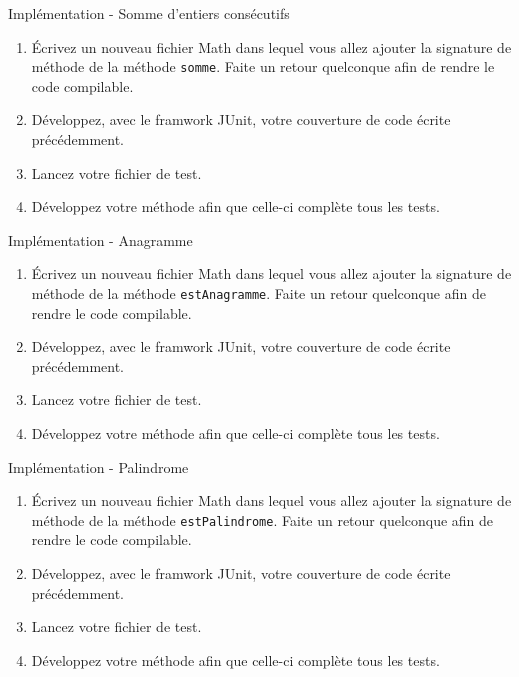 \documentclass[a4paper,11pt]{article}
\begin{document}
	\begin{Exercice}{Implémentation - Somme d'entiers consécutifs}
		\begin{enumerate}
			\item Écrivez un nouveau fichier Math dans lequel vous allez ajouter la signature de méthode de la méthode \texttt{somme}. Faite un retour quelconque afin de rendre le code compilable.
			\item Développez, avec le framwork JUnit, votre couverture de code écrite précédemment.
			\item Lancez votre fichier de test.
			\item Développez votre méthode afin que celle-ci complète tous les tests.
		\end{enumerate}
	\end{Exercice}
	
	\begin{Exercice}{Implémentation - Anagramme}
		\begin{enumerate}
			\item Écrivez un nouveau fichier Math dans lequel vous allez ajouter la signature de méthode de la méthode \texttt{estAnagramme}. Faite un retour quelconque afin de rendre le code compilable.
			\item Développez, avec le framwork JUnit, votre couverture de code écrite précédemment.
			\item Lancez votre fichier de test.
			\item Développez votre méthode afin que celle-ci complète tous les tests.
		\end{enumerate}
	\end{Exercice}

	\begin{Exercice}{Implémentation - Palindrome}
		\begin{enumerate}
			\item Écrivez un nouveau fichier Math dans lequel vous allez ajouter la signature de méthode de la méthode \texttt{estPalindrome}. Faite un retour quelconque afin de rendre le code compilable.
			\item Développez, avec le framwork JUnit, votre couverture de code écrite précédemment.
			\item Lancez votre fichier de test.
			\item Développez votre méthode afin que celle-ci complète tous les tests.
		\end{enumerate}
	\end{Exercice}
\end{document}
